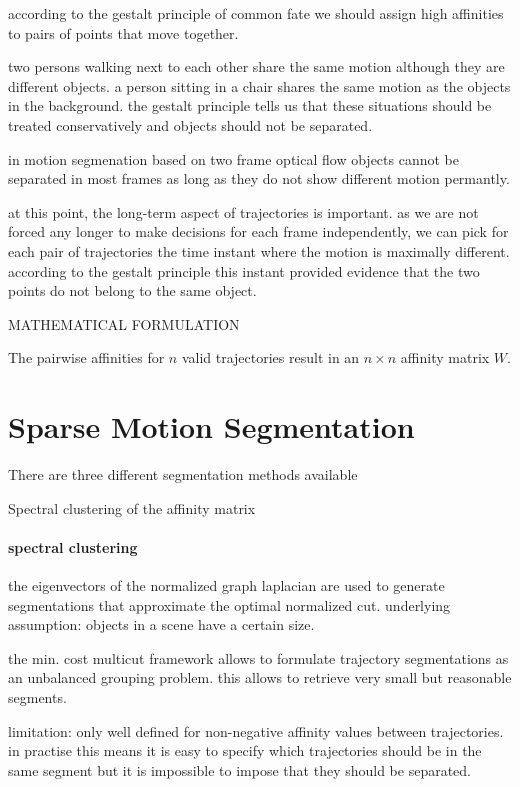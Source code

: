 according to the gestalt principle of common fate
we should assign high affinities to pairs of points that move together.

two persons walking next to each other share the same motion although they are different objects.
a person sitting in a chair shares the same motion as the objects in the background. 
the gestalt principle tells us that these situations should be treated conservatively and objects should not be separated. 

in motion segmenation based on two frame optical flow objects cannot be separated in most frames as long as they do not show different motion permantly. 

at this point, the long-term aspect of trajectories is important. as we are not forced any longer to make decisions for each frame independently, we can pick for each pair of trajectories the time instant where the motion is maximally different.
according to the gestalt principle this instant provided evidence that the two points do not belong to the same object.

MATHEMATICAL FORMULATION

The pairwise affinities for $n$ valid trajectories result in an $n \times n$ affinity matrix $W$.

\section{Sparse Motion Segmentation}
There are three different segmentation methods available


Spectral clustering of the affinity matrix


\paragraph{spectral clustering}
the eigenvectors of the normalized graph laplacian are used to generate segmentations that approximate the optimal normalized cut.
underlying assumption: objects in a scene have a certain size.

the min. cost multicut framework allows to formulate trajectory segmentations as an unbalanced grouping problem. this allows to retrieve very small but reasonable segments.

limitation: only well defined for non-negative affinity values between trajectories. in practise this means it is easy to specify which trajectories should be in the same segment but it is impossible to impose that they should be separated. 





